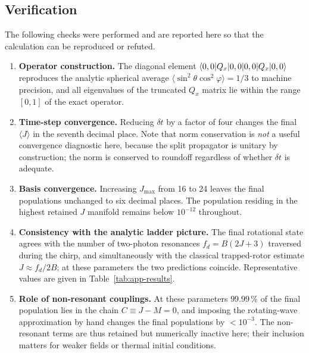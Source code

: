 \subsection{Verification}
\label{app:centrifuge-verification}

The following checks were performed and are reported here so that the
calculation can be reproduced or refuted.

\begin{enumerate}
  \item \textbf{Operator construction.} The diagonal element
        $\braket{0,0|Q_x|0,0}$ reproduces the analytic spherical average
        $\langle\sin^2\theta\cos^2\varphi\rangle = 1/3$ to machine precision,
        and all eigenvalues of the truncated $Q_x$ matrix lie within the range
        $[0,1]$ of the exact operator.
  \item \textbf{Time-step convergence.} Reducing $\delta t$ by a factor of
        four changes the final $\langle J\rangle$ in the seventh decimal
        place. Note that norm conservation is \emph{not} a useful convergence
        diagnostic here, because the split propagator is unitary by
        construction; the norm is conserved to roundoff regardless of whether
        $\delta t$ is adequate.
  \item \textbf{Basis convergence.} Increasing $J_{\max}$ from 16 to 24 leaves
        the final populations unchanged to six decimal places. The population
        residing in the highest retained $J$ manifold remains below $10^{-12}$
        throughout.
  \item \textbf{Consistency with the analytic ladder picture.} The final
        rotational state agrees with the number of two-photon resonances
        $f_d = B(2J+3)$ traversed during the chirp, and simultaneously with the
        classical trapped-rotor estimate $J\approx f_d/2B$; at these parameters
        the two predictions coincide. Representative values are given in
        Table~\ref{tab:app-results}.
  \item \textbf{Role of non-resonant couplings.} At these parameters
        $99.99\,\%$ of the final population lies in the chain
        $C\equiv J-M=0$, and imposing the rotating-wave approximation by hand
        changes the final populations by $<10^{-3}$. The non-resonant terms are
        thus retained but numerically inactive here; their inclusion matters
        for weaker fields or thermal initial conditions.
\end{enumerate}

